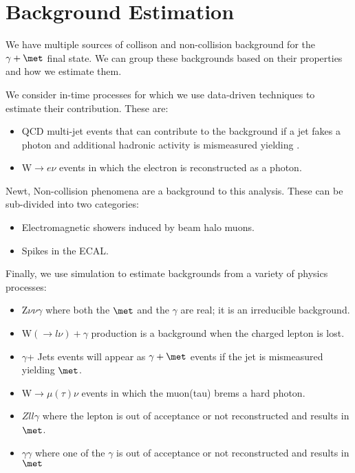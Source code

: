 \section{Background Estimation}
We have multiple sources of collison and non-collision background for the $\gamma + \met$ final state. We can group these backgrounds based on their properties and how we estimate them.

We consider in-time processes for which we use data-driven techniques to estimate their contribution. These are:

\begin{itemize}
 \item QCD multi-jet events that can contribute to the background if a jet fakes a photon and additional hadronic activity is mismeasured yielding \met.
 \item W$\rightarrow e \nu$ events in which the electron is reconstructed as a photon.
\end{itemize}

Newt, Non-collision phenomena are a background to this analysis. These can be sub-divided into two categories:

\begin{itemize}
\item Electromagnetic showers induced by beam halo muons.
\item Spikes in the ECAL.
\end{itemize}


Finally, we use simulation to estimate backgrounds from a variety of physics processes:

\begin{itemize}
\item Z$\nu\nu \gamma$ where both the $\met$ and the $\gamma$ are real; it is an irreducible background.
\item W$(\rightarrow l \nu) + \gamma$ production is a background when the charged lepton is lost.
\item $\gamma $+ Jets events will appear as $\gamma + \met $ events if the jet is mismeasured yielding $\met$.
\item W$\rightarrow \mu (\tau) \nu$ events in which the muon(tau) brems a hard photon.
\item $Z ll \gamma$ where the lepton is out of acceptance or not reconstructed and results in $\met$.
\item $\gamma \gamma$ where one of the $\gamma$ is out of acceptance or not reconstructed and results in $\met$
\end{itemize}

\label{sec:bkg}









